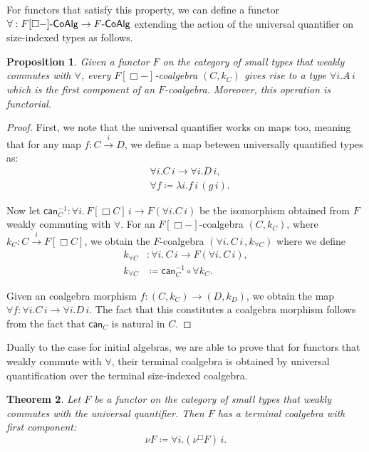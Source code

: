 \documentclass[10pt,a4paper]{article}
\newtheorem{theorem}{Theorem}
\newtheorem{proposition}[theorem]{Proposition}
\theoremstyle{definition}
\theoremstyle{remark}
\renewcommand{\.}{.\,} %
\renewcommand{\:}{:} %
\newcommand{\F}{F}
\newcommand{\sto}{\overset{i}{\to}}
\newcommand{\0}{\mathbf{0}}
\newcommand{\1}{\mathbf{1}}
\newcommand\<\langle
\renewcommand\>\rangle
\renewcommand\sf\mathsf
\theoremstyle{remark}
\begin{document}
For functors that satisfy this property, we can define a functor $\forall : F[\Box{-}]\text-\sf{CoAlg} \to F\text-\sf{CoAlg}$ extending the action of the universal quantifier on size-indexed types as follows.
\begin{proposition}
    Given a functor $F$ on the category of small types that weakly commutes with $\forall$, every $F[\Box-]$-coalgebra $(C, k_C)$ gives rise to a type $\forall i . A \, i$ which is the first component of an $F$-coalgebra. Moreover, this operation is functorial.
\end{proposition}
\begin{proof}
    First, we note that the universal quantifier works on maps too, meaning that for any map $f : C \sto D$, we define a map betewen universally quantified types as:
    \begin{align*}
        &\forall i . C \, i \to \forall i . D \, i, \\
        &\forall f \coloneq  \lambda i . f \, i \, (g \, i).
    \end{align*}

    Now let $\mathsf{can}_C^{-1} : \forall i \. F [\Box C] \, i \to \F (\forall i .C \, i) $ be the isomorphism obtained from $F$ weakly commuting with $\forall$.
    For an $F[\Box-]$-coalgebra $(C, k_C)$, where $k_C : C \sto F[\Box C]$, we obtain the $F$-coalgebra $(\forall i . \, C \, i \, , k_{\forall C})$ where we define
    \begin{align*}
        k_{\forall C}& : \forall i . \, C \, i \to F(\forall i . \, C \, i), \\
        k_{\forall C}& \coloneq  \mathsf{can}_C^{-1} \circ \forall  k_C.
    \end{align*}

    Given an coalgebra morphism $f: (C, k_C) \to (D, k_D)$, we obtain the map
    $\forall f : \forall i . C \, i \to \forall i . D \, i$. The fact that this constitutes a coalgebra morphism follows from the fact that $\mathsf{can}_C$ is natural in $C$.
\end{proof}

Dually to the case for initial algebras, we are able to prove that for functors that weakly commute with $\forall$, their terminal coalgebra is obtained by universal quantification over the terminal size-indexed coalgebra.

\begin{theorem}
    Let $\F$ be a functor on the category of small types that weakly commutes with the universal quantifier. Then $\F$ has a terminal coalgebra with first component:
    \[
    \nu  \F \coloneq  \forall i . (\nu^\Box F) \, i.
    \]
\end{theorem}
\end{document}
